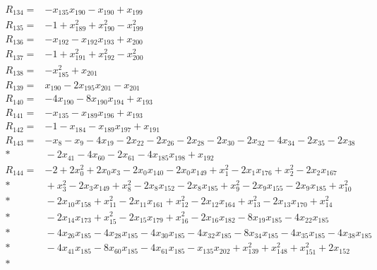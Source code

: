 \begin{align*}
R_{134} ={}& -x_{135}x_{190} - x_{190} + x_{199} \\[4pt]
R_{135} ={}& -1 + x_{189}^{2} + x_{190}^{2} - x_{199}^{2} \\[4pt]
R_{136} ={}& -x_{192} - x_{192}x_{193} + x_{200} \\[4pt]
R_{137} ={}& -1 + x_{191}^{2} + x_{192}^{2} - x_{200}^{2} \\[4pt]
R_{138} ={}& -x_{185}^{2} + x_{201} \\[4pt]
R_{139} ={}& x_{190} - 2x_{195}x_{201} - x_{201} \\[4pt]
R_{140} ={}& -4x_{190} - 8x_{190}x_{194} + x_{193} \\[4pt]
R_{141} ={}& -x_{135} - x_{189}x_{196} + x_{193} \\[4pt]
R_{142} ={}& -1 - x_{184} - x_{189}x_{197} + x_{191} \\[4pt]
R_{143} ={}& -x_{8} - x_{9} - 4x_{19} - 2x_{22} - 2x_{26} - 2x_{28} - 2x_{30} - 2x_{32} - 4x_{34} - 2x_{35} - 2x_{38} \\*
&{} - 2x_{41} - 4x_{60} - 2x_{61} - 4x_{185}x_{198} + x_{192} \\[4pt]
R_{144} ={}& -2 + 2x_{0}^{2} + 2x_{0}x_{3} - 2x_{0}x_{140} - 2x_{0}x_{149} + x_{1}^{2} - 2x_{1}x_{176} + x_{2}^{2} - 2x_{2}x_{167} \\*
&{} + x_{3}^{2} - 2x_{3}x_{149} + x_{8}^{2} - 2x_{8}x_{152} - 2x_{8}x_{185} + x_{9}^{2} - 2x_{9}x_{155} - 2x_{9}x_{185} + x_{10}^{2} \\*
&{} - 2x_{10}x_{158} + x_{11}^{2} - 2x_{11}x_{161} + x_{12}^{2} - 2x_{12}x_{164} + x_{13}^{2} - 2x_{13}x_{170} + x_{14}^{2} \\*
&{} - 2x_{14}x_{173} + x_{15}^{2} - 2x_{15}x_{179} + x_{16}^{2} - 2x_{16}x_{182} - 8x_{19}x_{185} - 4x_{22}x_{185} \\*
&{} - 4x_{26}x_{185} - 4x_{28}x_{185} - 4x_{30}x_{185} - 4x_{32}x_{185} - 8x_{34}x_{185} - 4x_{35}x_{185} - 4x_{38}x_{185} \\*
&{} - 4x_{41}x_{185} - 8x_{60}x_{185} - 4x_{61}x_{185} - x_{135}x_{202} + x_{139}^{2} + x_{148}^{2} + x_{151}^{2} + 2x_{152} \\*

\end{align*}
